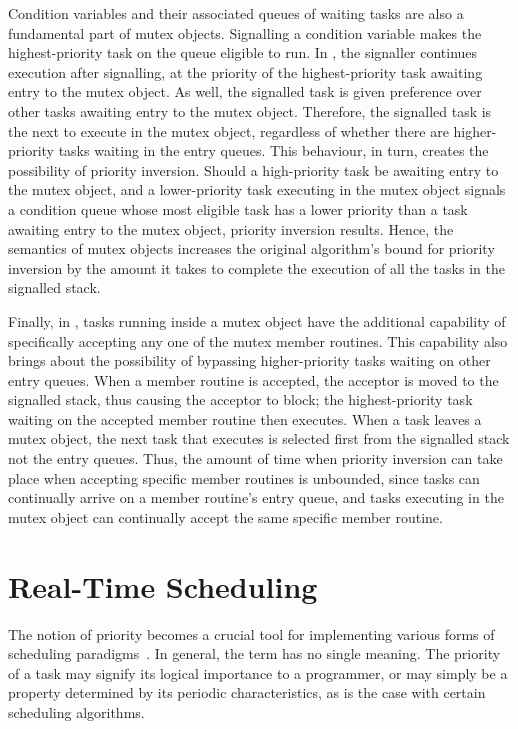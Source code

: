 \documentclass[openright,twoside]{report}
\begin{document}
Condition variables and their associated queues of waiting tasks are also a fundamental part of mutex objects.
Signalling a condition variable makes the highest-priority task on the queue eligible to run.
In \uC, the signaller continues execution after signalling, at the priority of the highest-priority task awaiting entry to the mutex object.
As well, the signalled task is given preference over other tasks awaiting entry to the mutex object.
Therefore, the signalled task is the next to execute in the mutex object, regardless of whether there are higher-priority tasks waiting in the entry queues.
This behaviour, in turn, creates the possibility of priority inversion.
Should a high-priority task be awaiting entry to the mutex object, and a lower-priority task executing in the mutex object signals a condition queue whose most eligible task has a lower priority than a task awaiting entry to the mutex object, priority inversion results.
Hence, the semantics of \uC mutex objects increases the original algorithm's bound for priority inversion by the amount it takes to complete the execution of all the tasks in the signalled stack.

Finally, in \uC, tasks running inside a mutex object have the additional capability of specifically accepting any one of the mutex member routines.
This capability also brings about the possibility of bypassing higher-priority tasks waiting on other entry queues.
When a member routine is accepted, the acceptor is moved to the signalled stack, thus causing the acceptor to block;
the highest-priority task waiting on the accepted member routine then executes.
When a task leaves a mutex object, the next task that executes is selected first from the signalled stack not the entry queues.
Thus, the amount of time when priority inversion can take place when accepting specific member routines is unbounded, since tasks can continually arrive on a member routine's entry queue, and tasks executing in the mutex object can continually accept the same specific member routine.


\section{Real-Time Scheduling}

\begin{sloppypar}
The notion of priority becomes a crucial tool for implementing various forms of scheduling paradigms~\cite{Adelberg94,Burns90,Golub94}.
In general, the term  has no single meaning.
The priority of a task may signify its logical importance to a programmer, or may simply be a property determined by its periodic characteristics, as is the case with certain scheduling algorithms.
\end{sloppypar}
\end{document}
